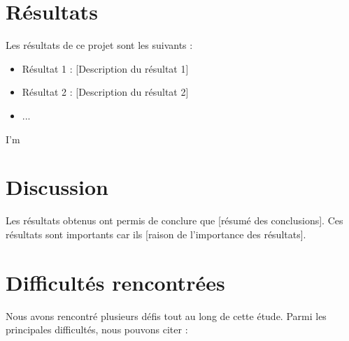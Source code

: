 \documentclass{article}
\begin{document}
\section{Résultats}
Les résultats de ce projet sont les suivants :
\begin{itemize}
    \item Résultat 1 : [Description du résultat 1]
    \item Résultat 2 : [Description du résultat 2]
    \item ...
\end{itemize}
I'm
\section{Discussion}
Les résultats obtenus ont permis de conclure que [résumé des conclusions]. Ces résultats sont importants car ils [raison de l'importance des résultats].

\section{Difficultés rencontrées}

Nous avons rencontré plusieurs défis tout au long de cette étude. Parmi les principales difficultés, nous pouvons citer :
\end{document}
